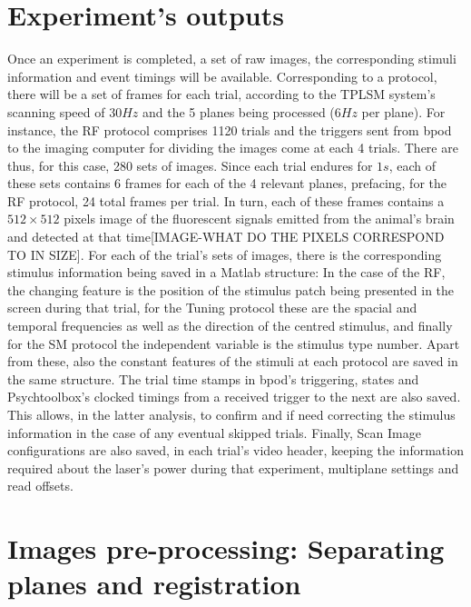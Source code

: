 \section{Experiment's outputs}
\label{sec:sectiona}

Once an experiment is completed, a set of raw images, the corresponding stimuli information and event timings will be available. Corresponding to a protocol, there will be a set of frames for each trial, according to the TPLSM system's scanning speed of $30 Hz$ and the 5 planes being processed ($6 Hz$ per plane). 
For instance, the RF protocol comprises 1120 trials and the triggers sent from bpod to the imaging computer for dividing  the images come at each 4 trials. There are thus, for this case, 280 sets of images. Since each trial endures for $1s$, each of these sets contains 6 frames for each of the 4 relevant planes, prefacing, for the RF protocol, 24 total frames per trial. In turn, each of these frames contains a $512 \times 512$ pixels image of the fluorescent signals emitted from the animal's brain and detected at that time[IMAGE-WHAT DO THE PIXELS CORRESPOND TO IN SIZE].
For each of the trial's sets of images, there is the corresponding stimulus information being saved in a Matlab structure: In the case of the RF, the changing feature is the position of the stimulus patch being presented in the screen during that trial, for the Tuning protocol these are the spacial and temporal frequencies as well as the direction of the centred stimulus, and finally for the SM protocol the independent variable is the stimulus type number. Apart from these, also the constant features of the stimuli at each protocol are saved in the same structure. 
The trial time stamps in bpod's triggering, states and Psychtoolbox's clocked timings from a received trigger to the next are also saved. This allows, in the latter analysis, to confirm and if need correcting the stimulus information in the case of any eventual skipped trials.
Finally, Scan Image configurations are also saved, in each trial's video header, keeping the information required about the laser's power during that experiment, multiplane settings and read offsets.

\section{Images pre-processing: Separating planes and registration}
\label{sec:sectionb}
